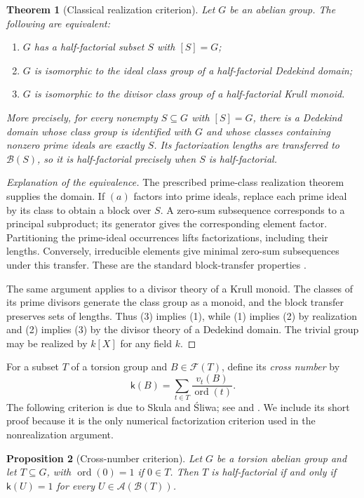 \documentclass[11pt,reqno]{amsart}
\numberwithin{equation}{section}
\newtheorem{theorem}{Theorem}[section]
\newtheorem{proposition}[theorem]{Proposition}
\theoremstyle{definition}
\theoremstyle{remark}
\newcommand{\B}{\mathcal B}
\newcommand{\F}{\mathcal F}
\newcommand{\A}{\mathcal A}
\DeclareMathOperator{\ord}{ord}
\begin{document}
\begin{theorem}[Classical realization criterion]\label{thm:realization}
Let $G$ be an abelian group. The following are equivalent:
\begin{enumerate}[label=\textup{(\arabic*)},leftmargin=2.2em]
\item $G$ has a half-factorial subset $S$ with $[S]=G$;
\item $G$ is isomorphic to the ideal class group of a half-factorial
Dedekind domain;
\item $G$ is isomorphic to the divisor class group of a half-factorial
Krull monoid.
\end{enumerate}
More precisely, for every nonempty $S\subseteq G$ with $[S]=G$,
there is a Dedekind domain whose class group is identified with $G$
and whose classes containing nonzero prime ideals are exactly $S$.
Its factorization lengths are transferred to $\B(S)$, so it is
half-factorial precisely when $S$ is half-factorial.
\end{theorem}

\begin{proof}[Explanation of the equivalence]
The prescribed prime-class realization theorem supplies the domain.
If $(a)$ factors into prime ideals, replace each prime ideal by its
class to obtain a block over $S$. A zero-sum subsequence corresponds
to a principal subproduct; its generator gives the corresponding
element factor. Partitioning the prime-ideal occurrences lifts
factorizations, including their lengths. Conversely, irreducible
elements give minimal zero-sum subsequences under this transfer.
These are the standard block-transfer properties
\cite{ChapmanGeroldinger,GHK}.

The same argument applies to a divisor theory of a Krull monoid.
The classes of its prime divisors generate the class group as a
monoid, and the block transfer preserves sets of lengths. Thus (3)
implies (1), while (1) implies (2) by realization and (2) implies
(3) by the divisor theory of a Dedekind domain. The trivial group
may be realized by $k[X]$ for any field $k$.
\end{proof}

For a subset $T$ of a torsion group and $B\in\F(T)$, define its
\emph{cross number} by
\[
 \mathsf k(B)=\sum_{t\in T}\frac{v_t(B)}{\ord(t)}.
\]
The following criterion is due to Skula and \'{S}liwa; see
\cite[Lemma~3.2]{GaoGeroldinger} and
\cite[Theorem~4.1]{Schmid2005}. We include its short proof because
it is the only numerical factorization criterion used in the
nonrealization argument.
\begin{proposition}[Cross-number criterion]\label{prop:cross}
Let $G$ be a torsion abelian group and let $T\subseteq G$, with
$\ord(0)=1$ if $0\in T$. Then $T$ is
half-factorial if and only if $\mathsf k(U)=1$ for every
$U\in\A(\B(T))$.
\end{proposition}
\end{document}
